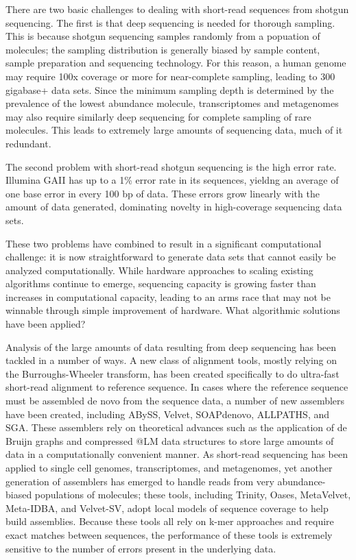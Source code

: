\documentclass[10pt,draft]{article}
\begin{document}
There are two basic challenges to dealing with short-read sequences
from shotgun sequencing. The first is that deep sequencing is needed
for thorough sampling. This is because shotgun sequencing samples
randomly from a popuation of molecules; the sampling distribution is
generally biased by sample content,
sample preparation and sequencing technology.  For this reason, a
human genome may require 100x coverage or more for near-complete
sampling, leading to 300 gigabase+ data sets.  Since the minimum sampling depth
is determined by the prevalence of the lowest abundance molecule, transcriptomes and
metagenomes may also require similarly deep sequencing for complete
sampling of rare molecules. This leads to extremely large amounts of
sequencing data, much of it redundant.

The second problem with short-read shotgun sequencing is the high
error rate.  Illumina GAII has up to a 1\% error rate in its
sequences, yieldng an average of one base error in every 100 bp of
data.  These errors grow linearly with the amount of data generated,
dominating novelty in high-coverage sequencing data sets.

These two problems have combined to result in a significant
computational challenge: it is now straightforward to generate data
sets that cannot easily be analyzed computationally.  While hardware approaches
to scaling existing algorithms continue to emerge, sequencing capacity
is growing faster than increases in computational capacity,
leading to an arms race that may not be winnable through simple improvement
of hardware.  What algorithmic solutions have been applied?

Analysis of the large amounts of data resulting from deep sequencing
has been tackled in a number of ways.  A new class of alignment tools,
mostly relying on the Burroughs-Wheeler transform, has been created
specifically to do ultra-fast short-read alignment to reference
sequence.  In cases where the reference sequence must be assembled de
novo from the sequence data, a number of new assemblers have been
created, including ABySS, Velvet, SOAPdenovo, ALLPATHS, and SGA.
These assemblers rely on theoretical advances such as the application
of de Bruijn graphs and compressed @LM data structures to store large
amounts of data in a computationally convenient manner.  As short-read
sequencing has been applied to single cell genomes, transcriptomes,
and metagenomes, yet another generation of assemblers has emerged to
handle reads from very abundance-biased populations of molecules;
these tools, including Trinity, Oases, MetaVelvet, Meta-IDBA, and
Velvet-SV, adopt local models of sequence coverage to help build
assemblies.  Because these tools all rely on k-mer approaches and
require exact matches between sequences, the performance of these
tools is extremely sensitive to the number of errors present in the
underlying data.
\end{document}
